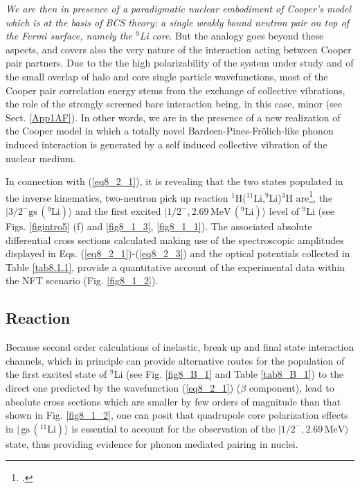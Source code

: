 \textit{We are then in presence of a paradigmatic nuclear embodiment of Cooper's model which is at the basis of BCS theory: a single weakly bound neutron pair on top of the Fermi surface, namely the  ${}^9$Li core}. But the analogy goes beyond these aspects, and covers also the very nature of the interaction acting between Cooper pair partners. Due to the  the high polarizability of the system under study and of the small overlap of halo and core single particle wavefunctions, most of the Cooper pair correlation energy stems from the exchange of collective vibrations, the role of the strongly screened bare interaction being, in this case, minor  (see Sect. \ref{App1AF}). In other words, we are in the presence of a new realization of the Cooper model in which a totally novel Bardeen-Pines-Fr\"olich-like phonon induced interaction is generated by a self induced collective vibration of the nuclear medium.



 In connection with  (\ref{eq8_2_1}), it is revealing that the two states populated in the  inverse kinematics, two-neutron pick up reaction $^1$H($^{11}$Li,$^9$Li)$^3$H are\footnote{\cite{Tanihata:08}.}, the $|3/2^-\text{gs}\,(^9\text{Li})\rangle$ and the first excited $|1/2^-,2.69\,\text{MeV}\,(^9\text{Li})\rangle$ level of $^9$Li  (see Figs. \ref{figintro5} (f) and  \ref{fig8_1_3}, \ref{fig8_1_1}). The associated absolute differential cross sections calculated making use of the spectroscopic amplitudes displayed in Eqs. (\ref{eq8_2_1})-(\ref{eq8_2_3}) and the optical potentials collected in Table \ref{tab8.1.1}, provide a quantitative account of the experimental data  within the NFT scenario (Fig. \ref{fig8_1_2}).  
 
 
 
\subsection{Reaction}\label{C6S1.2}
Because second order calculations of inelastic, break up and final state interaction channels, which in principle can provide alternative routes for the population of the first excited state of $^9$Li (see Fig. \ref{fig8_B_1} and Table \ref{tab8_B_1}) to the direct one predicted by the wavefunction (\ref{eq8_2_1})  ($\beta$ component), lead to absolute cross sections which are smaller by few orders of magnitude than that shown in Fig. \ref{fig8_1_2}, one can posit that quadrupole core polarization effects in $|\,\text{gs}\,(^{11}\text{Li})\rangle$ is essential to account for the observation of the $|1/2^-,2.69\,\text{MeV}\rangle$ state, thus providing evidence for phonon mediated pairing in nuclei. 
 
